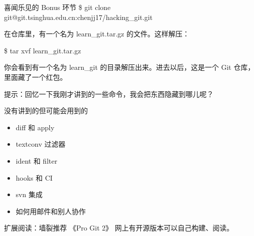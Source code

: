 \documentclass{beamer}
\begin{document}
\begin{frame}{喜闻乐见的 Bonus 环节}
    \$ git clone git@git.tsinghua.edu.cn:chenjj17/hacking\_git.git

    在仓库里，有一个名为 learn\_git.tar.gz 的文件。这样解压：

    \$ tar xvf learn\_git.tar.gz

    你会看到有一个名为 learn\_git 的目录解压出来。进去以后，这是一个 Git 仓库，里面藏了一个红包。

    提示：回忆一下我刚才讲到的一些命令，我会把东西隐藏到哪儿呢？
\end{frame}

\begin{frame}{没有讲到的但可能会用到的}
    \begin{itemize}
        \item diff 和 apply
        \item textconv 过滤器
        \item ident 和 filter
        \item hooks 和 CI
        \item svn 集成
        \item 如何用邮件和别人协作
    \end{itemize}

    扩展阅读：墙裂推荐 《Pro Git 2》 网上有开源版本可以自己构建、阅读。
\end{frame}
\end{document}
